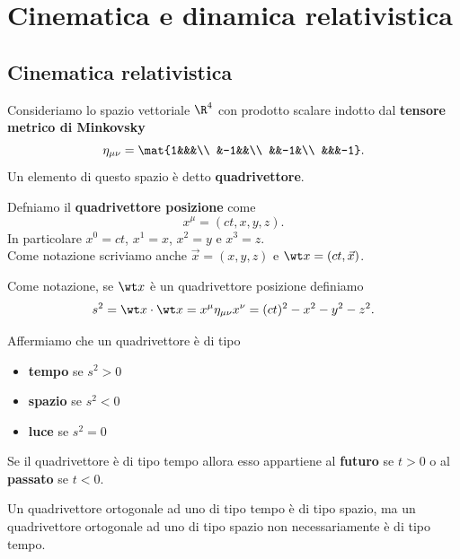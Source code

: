 \chapter{Cinematica e dinamica relativistica}
\section{Cinematica relativistica}
\begin{definition}[Quadrivettore]
Consideriamo lo spazio vettoriale $\R^4$ con prodotto scalare indotto dal \textbf{tensore metrico di Minkovsky}
\[\eta_{\mu\nu}=\mat{1&&&\\
&-1&&\\
&&-1&\\
&&&-1}.\]
Un elemento di questo spazio \`e detto \textbf{quadrivettore}.
\end{definition}

\begin{definition}
Defniamo il \textbf{quadrivettore posizione} come
\[x^\mu=(ct,x,y,z).\]
In particolare $x^0=ct$, $x^1=x$, $x^2=y$ e $x^3=z$.\\
Come notazione scriviamo anche $\vec x=(x,y,z)$ e $\wt x=(ct,\vec x)$.
\end{definition}

\begin{notation}
Come notazione, se $\wt x$ \`e un quadrivettore posizione definiamo
\[s^2=\wt x\cdot \wt x=x^\mu\eta_{\mu\nu}x^\nu=(ct)^2-x^2-y^2-z^2.\]
\end{notation}

\begin{definition}
Affermiamo che un quadrivettore \`e di tipo 
\begin{itemize}
\item \textbf{tempo} se $s^2>0$
\item \textbf{spazio} se $s^2<0$
\item \textbf{luce} se $s^2=0$
\end{itemize}
Se il quadrivettore \`e di tipo tempo allora esso appartiene al \textbf{futuro} se $t>0$ o al \textbf{passato} se $t<0$.
\end{definition}

\begin{remark}
Un quadrivettore ortogonale ad uno di tipo tempo \`e di tipo spazio, ma un quadrivettore ortogonale ad uno di tipo spazio non necessariamente \`e di tipo tempo.
\end{remark}

